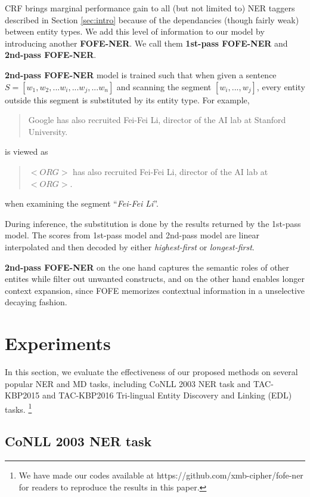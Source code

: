 \documentclass[11pt,a4paper]{article}
\begin{document}
CRF brings marginal performance gain to all (but not limited to) NER taggers described in Section \ref{sec:intro} because of the dependancies (though fairly weak) between entity types. We add this level of information to our model by introducing another {\bf FOFE-NER}. We call them {\bf 1st-pass FOFE-NER} and {\bf 2nd-pass FOFE-NER}.

{\bf 2nd-pass FOFE-NER} model is trained such that 
when given a sentence $S = [w_1, w_2, ... w_i, ... w_j, ... w_n]$ and 
scanning the segment $[w_i, ..., w_j]$, 
every entity outside this segment is substituted by its entity type. For example, 
\begin{quote}
	\small
	Google has also recruited Fei-Fei Li, director of the AI lab at Stanford University.
\end{quote}
is viewed as
\begin{quote}
	\small
	$<ORG>$ has also recruited Fei-Fei Li, director of the AI lab at $<ORG>$.
\end{quote}
when examining the segment ``{\it Fei-Fei Li}''.

During inference, the substitution is done by the results returned by the 1st-pass model. The scores from 1st-pass model and 2nd-pass model are linear interpolated and then decoded by either {\it highest-first} or {\it longest-first}. 

{\bf 2nd-pass FOFE-NER} on the one hand captures the semantic roles of other entites while filter out unwanted constructs, and on the other hand enables longer context expansion, since FOFE memorizes contextual information in a unselective decaying fashion. 


\section{Experiments}

In this section, we evaluate the effectiveness of our proposed methods on several popular NER and MD tasks, including CoNLL 2003 NER task and 
TAC-KBP2015 and TAC-KBP2016 Tri-lingual Entity Discovery and Linking (EDL) tasks.
\footnote{We have made our codes available at https://github.com/xmb-cipher/fofe-ner for readers to reproduce the results in this paper.}

\subsection{CoNLL 2003 NER task}
\label{exp-subsec:conll2003}
\end{document}
